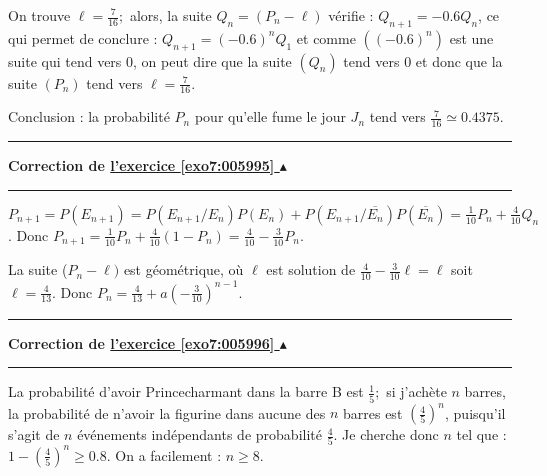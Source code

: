 \documentclass[11pt,a4paper]{article}
\newcounter{exo}
\newcommand{\correction}[1]{\hypertarget{cor7:#1}{}\label{cor7:#1}{\bf Correction de \hyperlink{exo7:#1}{l'exercice \ref{exo7:#1} $\blacktriangle$}}\vspace{1mm}\hrule\vspace{1mm}}
\newcommand{\fincorrection}{\vspace{1mm}\hrule\vspace*{7mm}}
\begin{document}
On trouve $\ell=\frac{7}{16};$ alors, la suite $Q_{n}=(P_{n}- \ell)$ vérifie : 
$Q_{n+1}= - 0.6Q_{n}$, ce qui permet de 
conclure : $Q_{n+1}=(-0.6)^{n}Q_{1}$
et comme $((-0.6)^{n})$ est une suite qui tend vers $0$, on peut dire que la
suite $(Q_{n})$ tend vers $0$ et donc que la suite $(P_n)$ tend vers $\ell=\frac{7}{16}.$

Conclusion : la probabilité $P_{n}$ pour qu'elle fume le jour $J_{n}$
tend vers $\frac{7}{16} \simeq 0.4375$.
\fincorrection
\correction{005995}
 $P_{n+1}=P(E_{n+1})=
P(E_{n+1}/E_n)P(E_n)+P(E_{n+1}/\overline{E_n})P(\overline{E_n})=\frac{1}{10}P_{n}+\frac{4}{10}Q_{n}$.
Donc
$P_{n+1}=\frac{1}{10}P_{n}+\frac{4}{10}(1-P_{n})=\frac{4}{10}-\frac{3}{10}P_{n}$.

La suite ($P_{n}-\ell)$ est géométrique, où $\ell$ est solution
de $\frac{4}{10}-\frac{3}{10}\ell=\ell$ soit $\ell=\frac{4}{13}$.
Donc $P_{n}=\frac{4}{13}+a(-\frac{3}{10})^{n-1}$.
\fincorrection
\correction{005996}
La probabilité d'avoir Princecharmant dans la barre B est $\frac{1}{5}; $ si j'achète $n$ barres, la probabilité de n'avoir la
figurine dans aucune des $n$ barres est $(\frac{4}{5})^{n}$, puisqu'il
s'agit de $n$ événements indépendants de probabilité $\frac{4}{5}$.
Je cherche donc $n$ tel que : $1-(\frac{4}{5})^{n}\geq 0.8$. On a facilement : $n\geq 8$.
\end{document}
